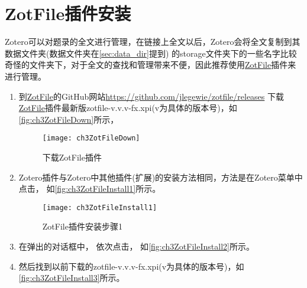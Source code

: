 \documentclass[cn,11pt,chinese]{elegantbook}
\begin{document}
		\section{ ZotFile插件安装}\label{sec:ZotFileInstall}
		Zotero可以对题录的全文进行管理，在链接上全文以后，Zotero会将全文复制到其数据文件夹(数据文件夹在\cref{sec:data_dir}提到)
		的storage文件夹下的一些名字比较奇怪的文件夹下，对于全文的查找和管理带来不便，因此推荐使用\href{http://zotfile.com/}{ZotFile}插件来进行管理。
		\begin{enumerate}
			\item 到\href{http://zotfile.com/}{ZotFile}的GitHub网站\url{https://github.com/jlegewie/zotfile/releases}
			下载\href{http://zotfile.com/}{ZotFile}插件最新版zotfile-v.v.v-fx.xpi(v为具体的版本号)，如\autoref{fig:ch3ZotFileDown}所示，
			\begin{figure}
				\centering
				\texttt{[image: ch3ZotFileDown]}
				\caption{下载ZotFile插件}
				\label{fig:ch3ZotFileDown}
			\end{figure}
			
			\item
			Zotero插件与Zotero中其他插件(扩展)的安装方法相同，方法是在Zotero菜单中点击，
			如\autoref{fig:ch3ZotFileInstall1}所示。
			\begin{figure}[htbp]
				\centering
				\texttt{[image: ch3ZotFileInstall1]}
				\caption{ZotFile插件安装步骤1}
				\label{fig:ch3ZotFileInstall1}
			\end{figure}
			\item
			在弹出的对话框中，
			依次点击，
			如\autoref{fig:ch3ZotFileInstall2}所示。
			\item
			然后找到以前下载的zotfile-v.v.v-fx.xpi(v为具体的版本号)，如\autoref{fig:ch3ZotFileInstall3}所示。
			

\end{enumerate}
\end{document}
